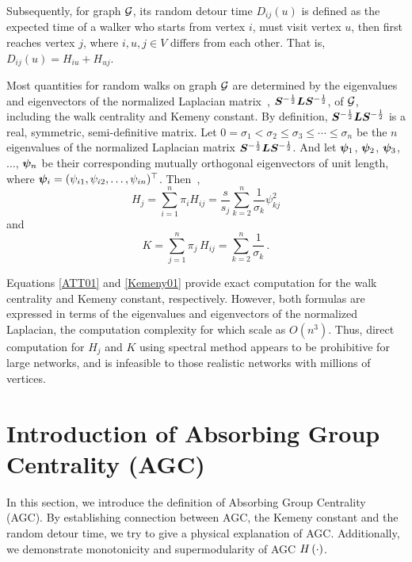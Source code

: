 \documentclass[journal]{IEEEtran}
\begin{document}
Subsequently, for graph \(\mathcal{G}\), its random detour time \(D_{ij}(u)\) is defined as the expected time of a walker who starts from vertex \(i\), must visit vertex \(u\), then first reaches vertex \(j\), where \(i,u,j\in V\) differs from each other.
That is, \(D_{ij}(u)= H_{iu}+H_{uj}\).

Most quantities for random walks on graph \(\mathcal{G}\) are determined by the eigenvalues and eigenvectors of the normalized Laplacian matrix~\cite{Ch97}, \({\boldsymbol{S}}^{-\frac{1}{2}}\boldsymbol{L} {\boldsymbol{S}}^{-\frac{1}{2}}\), of \(\mathcal{G}\), including the walk centrality and Kemeny constant. By definition, \({\boldsymbol{S}}^{-\frac{1}{2}}\boldsymbol{L} {\boldsymbol{S}}^{-\frac{1}{2}}\) is a real, symmetric, semi-definitive matrix. Let \(0=\sigma_1 < \sigma_2 \leq \sigma_3 \leq \cdots \leq \sigma_n \) be the \(n\) eigenvalues of the normalized Laplacian matrix \({\boldsymbol{S}}^{-\frac{1}{2}}\boldsymbol{L} {\boldsymbol{S}}^{-\frac{1}{2}}\). And let \(\boldsymbol{\psi}_1\), \(\boldsymbol{\psi}_2\), \(\boldsymbol{\psi}_3\), \(\ldots\), \(\boldsymbol{\psi}_n\) be their corresponding mutually orthogonal eigenvectors of unit length, where \(\boldsymbol{\psi}_i=(\psi_{i1},\psi_{i2},\ldots,\psi_{in})^{\top}\). Then~\cite{Lo93,Be16},
\begin{equation}\label{ATT01}
    H_j=\sum_{i=1}^{n} \pi_i H_{ij}=\frac{s}{s_j}\sum_{k=2}^{n}\frac{1}{\sigma_{k}}\psi_{kj}^{2}
\end{equation}
and
\begin{equation}\label{Kemeny01}
    K =\sum_{j=1}^{n}\pi_j\,H_{ij} =\sum_{k=2}^{n}\frac{1}{\sigma_{k}}\,.
\end{equation}

Equations \eqref{ATT01} and \eqref{Kemeny01} provide exact computation for the walk centrality and Kemeny constant, respectively. However, both formulas are expressed in terms of the eigenvalues and eigenvectors of the normalized Laplacian, the computation complexity for which scale as \(O(n^3)\). Thus, direct  computation for \(H_j\) and \(K\)  using spectral method appears to be prohibitive for large networks, and is infeasible to those realistic networks with millions of vertices.

\section{Introduction of Absorbing Group Centrality (AGC)}

In this section, we introduce the definition of Absorbing Group Centrality (AGC).
By establishing connection between AGC, the Kemeny constant and the random detour time, we try to give a physical explanation of AGC.
Additionally, we demonstrate monotonicity and supermodularity of AGC \(H\left(\cdot\right)\).
\end{document}
